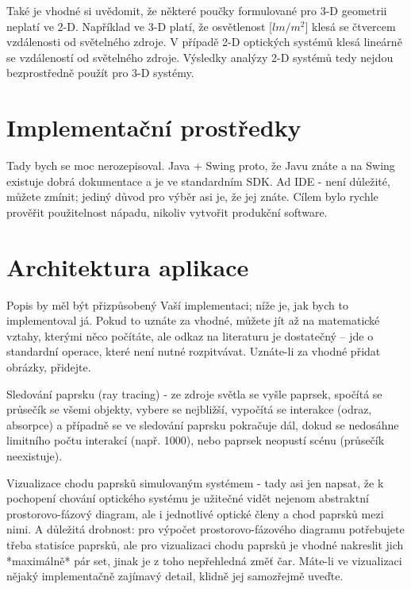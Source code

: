 Také je vhodné si uvědomit, že některé poučky formulované pro 3-D
geometrii neplatí ve 2-D. Například ve 3-D platí, že osvětlenost
[$lm/m^2$] klesá se čtvercem vzdálenosti od světelného zdroje. V případě
2-D optických systémů klesá lineárně se vzdáleností od světelného
zdroje. Výsledky analýzy 2-D systémů tedy nejdou bezprostředně použít
pro 3-D systémy.



\section{Implementační prostředky}


Tady bych se moc nerozepisoval. Java + Swing proto, že Javu znáte a na
Swing existuje dobrá dokumentace a je ve standardním SDK. Ad IDE - není
důležité, můžete zmínit; jediný důvod pro výběr asi je, že jej znáte.
Cílem bylo rychle prověřit použitelnost nápadu, nikoliv vytvořit
produkční software.



\section{Architektura aplikace}


Popis by měl být přizpůsobený Vaší implementaci; níže je, jak bych to
implementoval já. Pokud to uznáte za vhodné, můžete jít až na
matematické vztahy, kterými něco počítáte, ale odkaz na literaturu je
dostatečný -- jde o standardní operace, které není nutné rozpitvávat.
Uznáte-li za vhodné přidat obrázky, přidejte.

Sledování paprsku (ray tracing) - ze zdroje světla se vyšle paprsek,
spočítá se průsečík se všemi objekty, vybere se nejbližší, vypočítá se
interakce (odraz, absorpce) a případně se ve sledování paprsku pokračuje
dál, dokud se nedosáhne limitního počtu interakcí (např. 1000), nebo
paprsek neopustí scénu (průsečík neexistuje).

Vizualizace chodu paprsků simulovaným systémem - tady asi jen napsat, že
k pochopení chování optického systému je užitečné vidět nejenom
abstraktní prostorovo-fázový diagram, ale i jednotlivé optické členy a
chod paprsků mezi nimi. A důležitá drobnost: pro výpočet
prostorovo-fázového diagramu potřebujete třeba statisíce paprsků, ale
pro vizualizaci chodu paprsků je vhodné nakreslit jich *maximálně* pár
set, jinak je z toho nepřehledná změť čar. Máte-li ve vizualizaci nějaký
implementačně zajímavý detail, klidně jej samozřejmě uveďte.

